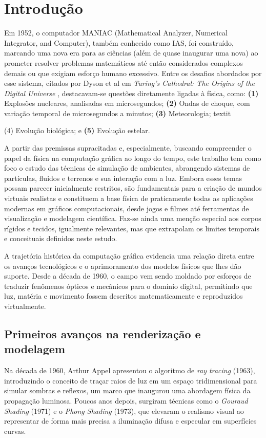 \section{Introdução}

Em 1952, o computador MANIAC (Mathematical Analyzer, Numerical Integrator, and Computer), também conhecido como IAS, foi construído, marcando uma nova era para as ciências (além de quase inaugurar uma nova) ao prometer resolver problemas matemáticos até então considerados complexos demais ou que exigiam esforço humano excessivo. Entre os desafios abordados por esse sistema, citados por Dyson et al em \textit{Turing’s Cathedral: The Origins of the Digital Universe} \cite{dyson2012turing}, destacavam-se questões diretamente ligadas à física, como: \textbf{(1)} Explosões nucleares, analisadas em microsegundos; \textbf{(2)} Ondas de choque, com variação temporal de microsegundos a minutos; \textbf{(3)} Meteorologia; textit{(4) Evolução biológica; e \textbf{(5)} Evolução estelar.

A partir das premissas supracitadas e, especialmente, buscando compreender o papel da física na computação gráfica ao longo do tempo, este trabalho tem como foco o estudo das técnicas de simulação de ambientes, abrangendo sistemas de partículas, fluidos e terrenos e sua interação com a luz. Embora esses temas possam parecer inicialmente restritos, são fundamentais para a criação de mundos virtuais realistas e constituem a base física de praticamente todas as aplicações modernas em gráficos computacionais, desde jogos e filmes até ferramentas de visualização e modelagem científica. Faz-se ainda uma menção especial aos corpos rígidos e tecidos, igualmente relevantes, mas que extrapolam os limites temporais e conceituais definidos neste estudo.

A trajetória histórica da computação gráfica evidencia uma relação direta entre os avanços tecnológicos e o aprimoramento dos modelos físicos que lhes dão suporte. Desde a década de 1960, o campo vem sendo moldado por esforços de traduzir fenômenos ópticos e mecânicos para o domínio digital, permitindo que luz, matéria e movimento fossem descritos matematicamente e reproduzidos virtualmente.

\subsection{Primeiros avanços na renderização e modelagem}

Na década de 1960, Arthur Appel apresentou o algoritmo de \textit{ray tracing} (1963), introduzindo o conceito de traçar raios de luz em um espaço tridimensional para simular sombras e reflexos, um marco que inaugurou uma abordagem física da propagação luminosa. Poucos anos depois, surgiram técnicas como o \textit{Gouraud Shading} (1971) e o \textit{Phong Shading} (1973), que elevaram o realismo visual ao representar de forma mais precisa a iluminação difusa e especular em superfícies curvas.

}
